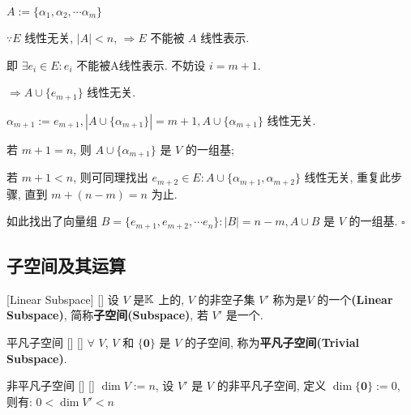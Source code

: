 \documentclass[UTF8]{ctexart}
\DeclareMathOperator{\0}{\mathbf{0}}
\DeclareMathOperator{\<}{\langle}
\renewcommand{\>}{\rangle}
\begin{document}
		\begin{prf}
			
			 \(A:=\{\alpha_{1},\alpha_{2},\cdots \alpha_{m}\}\) 
			
			 \(\because E\) 线性无关,  \(|A|<n\),  \(\Longrightarrow E\) 不能被 \(A\) 线性表示. 
			
			即 \(\exists e_{i}\in E: e_{i}\) 不能被{A}线性表示. 不妨设 \(i=m+1\). 
			
			 \(\Longrightarrow A\cup \{e_{m+1}\}\) 线性无关. 
			
			 \(\alpha_{m+1}:=e_{m+1}, |A\cup\{\alpha_{m+1}\}|=m+1, A\cup\{\alpha_{m+1}\}\) 线性无关. 
			
			若 \(m+1=n\), 则 \(A\cup\{\alpha_{m+1}\}\) 是 \(V\) 的一组基; 
			
			若 \(m+1<n\), 则可同理找出 \(e_{m+2}\in E: A\cup\{\alpha_{m+1}, \alpha_{m+2}\}\) 线性无关, 重复此步骤, 直到 \(m+(n-m)=n\) 为止. 
			
			如此找出了向量组 \(B=\{e_{m+1},e_{m+2},\cdots e_{n}\}: |B|=n-m, A\cup B\) 是 \(V\) 的一组基.  \(\square\) 
		\end{prf}
		
	\subsection{子空间及其运算}
		
		\begin{dfn}
			{}
			[Linear Subspace]
			[]
			设 \(V\) 是 \(\operatorname{\mathbb{K}}\) 上的,  \(V\) 的非空子集 \(V'\) 称为是 \(V\) 的一个\textbf{(Linear Subspace)}, 简称\textbf{子空间(Subspace)}, 若 \(V'\) 是一个. 
		\end{dfn}
		
		\begin{ppt}
			[]
			{平凡子空间}
			[]
			[]
			 \(\forall\)  \(V\),  \(V\) 和 \(\{\mathbf{0}\}\) 是 \(V\) 的子空间, 称为\textbf{平凡子空间(Trivial Subspace)}. 
		\end{ppt}
		
		\begin{ppt}
			[]
			{非平凡子空间}
			[]
			[]
			 \(\dim V:=n\), 设 \(V'\) 是 \(V\) 的非平凡子空间, 定义 \(\dim \{\mathbf{0}\}:=0\), 则有:  \(0<\dim V'<n\) 
		\end{ppt}
  
\end{document}
